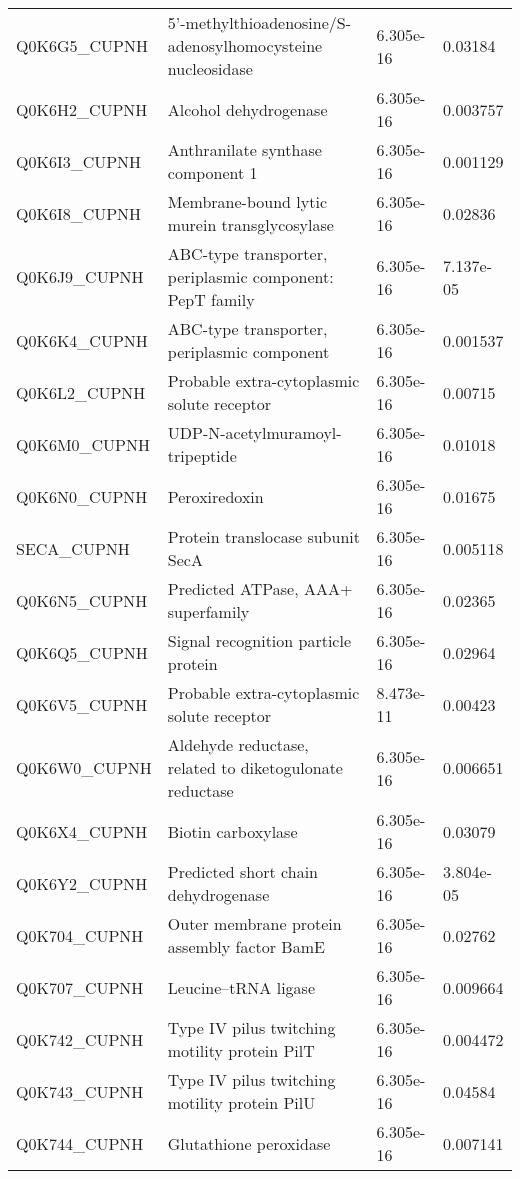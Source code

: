\begin{center}
\begin{longtable}{ l l l l }
Q0K6G5\_CUPNH & 5'-methylthioadenosine/S-adenosylhomocysteine nucleosidase& 6.305e-16 & 0.03184 \\ [0.5ex]
Q0K6H2\_CUPNH & Alcohol dehydrogenase& 6.305e-16 & 0.003757 \\ [0.5ex]
Q0K6I3\_CUPNH & Anthranilate synthase component 1& 6.305e-16 & 0.001129 \\ [0.5ex]
Q0K6I8\_CUPNH & Membrane-bound lytic murein transglycosylase& 6.305e-16 & 0.02836 \\ [0.5ex]
Q0K6J9\_CUPNH & ABC-type transporter, periplasmic component: PepT family& 6.305e-16 & 7.137e-05 \\ [0.5ex]
Q0K6K4\_CUPNH & ABC-type transporter, periplasmic component& 6.305e-16 & 0.001537 \\ [0.5ex]
Q0K6L2\_CUPNH & Probable extra-cytoplasmic solute receptor& 6.305e-16 & 0.00715 \\ [0.5ex]
Q0K6M0\_CUPNH & UDP-N-acetylmuramoyl-tripeptide & 6.305e-16 & 0.01018 \\ [0.5ex]
Q0K6N0\_CUPNH & Peroxiredoxin& 6.305e-16 & 0.01675 \\ [0.5ex]
SECA\_CUPNH & Protein translocase subunit SecA& 6.305e-16 & 0.005118 \\ [0.5ex]
Q0K6N5\_CUPNH & Predicted ATPase, AAA+ superfamily& 6.305e-16 & 0.02365 \\ [0.5ex]
Q0K6Q5\_CUPNH & Signal recognition particle protein& 6.305e-16 & 0.02964 \\ [0.5ex]
Q0K6V5\_CUPNH & Probable extra-cytoplasmic solute receptor& 8.473e-11 & 0.00423 \\ [0.5ex]
Q0K6W0\_CUPNH & Aldehyde reductase, related to diketogulonate reductase& 6.305e-16 & 0.006651 \\ [0.5ex]
Q0K6X4\_CUPNH & Biotin carboxylase& 6.305e-16 & 0.03079 \\ [0.5ex]
Q0K6Y2\_CUPNH & Predicted short chain dehydrogenase& 6.305e-16 & 3.804e-05 \\ [0.5ex]
Q0K704\_CUPNH & Outer membrane protein assembly factor BamE& 6.305e-16 & 0.02762 \\ [0.5ex]
Q0K707\_CUPNH & Leucine--tRNA ligase& 6.305e-16 & 0.009664 \\ [0.5ex]
Q0K742\_CUPNH & Type IV pilus twitching motility protein PilT& 6.305e-16 & 0.004472 \\ [0.5ex]
Q0K743\_CUPNH & Type IV pilus twitching motility protein PilU& 6.305e-16 & 0.04584 \\ [0.5ex]
Q0K744\_CUPNH & Glutathione peroxidase& 6.305e-16 & 0.007141 \\ [0.5ex]

\end{longtable}
\end{center}
